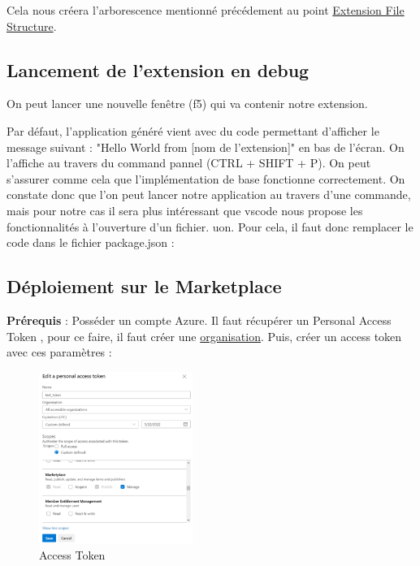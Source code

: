 \documentclass[
    iict, %
    il, %
]{heig-tb}
\begin{document}
Cela nous créera l'arborescence mentionné précédement au point \hyperref[Extension File Structure]{Extension File Structure}.

\subsection{Lancement de l'extension en debug}
On peut lancer une nouvelle fenêtre (f5) qui va contenir notre extension.

Par défaut, l'application généré vient avec du code permettant d'afficher le message suivant : "Hello World from [nom de l'extension]" en bas de l'écran. On l'affiche au travers du command pannel (CTRL + SHIFT + P). On peut s'assurer comme cela que l'implémentation de base fonctionne correctement.
On constate donc que l'on peut lancer notre application au travers d'une commande, mais pour notre cas il sera plus intéressant que vscode nous propose les fonctionnalités à l'ouverture d'un fichier. uon.
Pour cela, il faut donc remplacer le code dans le fichier package.json :

\subsection{Déploiement sur le Marketplace}

\textbf{Prérequis} : Posséder un compte Azure.
Il faut récupérer un Personal Access Token , pour ce faire, il faut créer une \href{https://docs.microsoft.com/en-us/azure/devops/organizations/accounts/create-organization?view=azure-devops}{organisation}.
Puis, créer un access token avec ces paramètres :
\begin{figure}[!ht]
    \begin{center}
        \includegraphics[width=5cm]{assets/figures/access-token.png}
    \end{center}
    \caption[Access Token]{\label{access-token}Access Token}
\end{figure}
\end{document}
